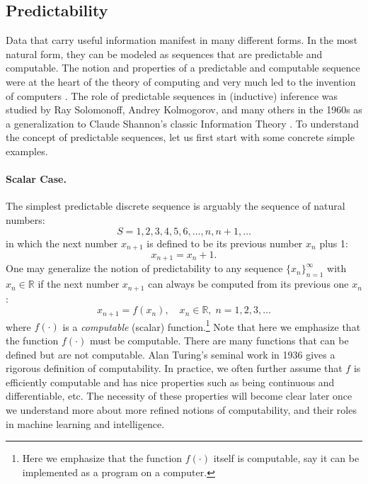 \documentclass[../../book-main.tex]{subfiles}
\begin{document}
\subsection{Predictability}
\label{sec:predictability}
Data that carry useful information manifest in many different forms. In the most natural form, they can be modeled as sequences that are predictable and computable. The notion and properties of a predictable and computable sequence were at the heart of the theory of computing and very much led to the invention of computers \cite{Turing-1936}. The role of predictable sequences in (inductive) inference was studied by Ray Solomonoff, Andrey Kolmogorov, and many others in the 1960s \cite{Kolmogorov1998OnTO} as a generalization to Claude Shannon's classic Information Theory \cite{Shannon-1948}. To understand the concept of predictable sequences, let us first start with some concrete simple examples. 
\paragraph{Scalar Case.} The simplest predictable discrete sequence is arguably the sequence of natural numbers:
\begin{equation}
   {S} =  1, 2, 3, 4, 5, 6, \ldots, n, n+1, \ldots
\end{equation}
in which the next number $x_{n+1}$ is defined to be its previous number $x_n$ plus 1:
\begin{equation}
x_{n+1} = x_n + 1.    
\end{equation}
One may generalize the notion of predictability to any sequence $\{x_n\}_{n=1}^\infty$ with $ x_n \in \mathbb{R}$ if the next number $x_{n+1}$ can always be computed from its previous one $x_n$:
\begin{equation}
    x_{n+1} = f(x_{n}), \quad x_n \in \mathbb{R}, \; n =  1, 2, 3, \ldots
\end{equation}
where $f(\cdot)$ is a {\em computable} (scalar) function.\footnote{Here we emphasize that the function $f(\cdot)$ itself is computable, say it can be implemented as a program on a computer. } Note that here we emphasize that the function $f(\cdot)$ must be computable. There are many functions that can be defined but are not computable. Alan Turing's seminal work in 1936 \cite{Turing-1936} gives a rigorous definition of computability. In practice, we often further assume that $f$ is efficiently computable and has nice properties such as being continuous and differentiable, etc. The necessity of these properties will become clear later once we understand more about more refined notions of computability, and their roles in machine learning and intelligence.
\end{document}
